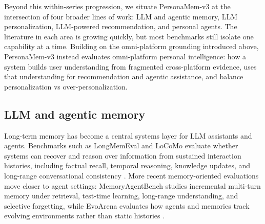 \documentclass[]{fairmeta}
\begin{document}
Beyond this within-series progression, we situate PersonaMem-v3 at the intersection of four broader lines of work: LLM and agentic memory, LLM personalization, LLM-powered recommendation, and personal agents. The literature in each area is growing quickly, but most benchmarks still isolate one capability at a time. Building on the omni-platform grounding introduced above, PersonaMem-v3 instead evaluates omni-platform personal intelligence: how a system builds user understanding from fragmented cross-platform evidence, uses that understanding for recommendation and agentic assistance, and balance personalization vs over-personalization.

\subsection{LLM and agentic memory}

Long-term memory has become a central systems layer for LLM assistants and agents. Benchmarks such as LongMemEval and LoCoMo evaluate whether systems can recover and reason over information from sustained interaction histories, including factual recall, temporal reasoning, knowledge updates, and long-range conversational consistency \citep{wu2024longmemeval,maharana2024locomo}. More recent memory-oriented evaluations move closer to agent settings: MemoryAgentBench studies incremental multi-turn memory under retrieval, test-time learning, long-range understanding, and selective forgetting, while EvoArena evaluates how agents and memories track evolving environments rather than static histories \citep{hu2025memoryagentbench,xu2026evoarena}.
\end{document}
